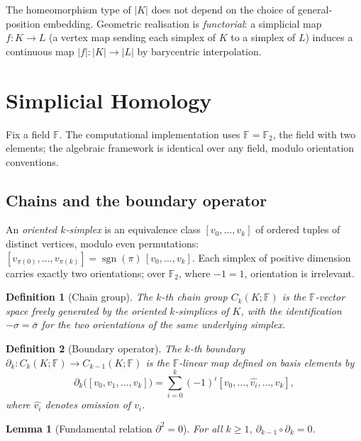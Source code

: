 \documentclass[onluarkali,ingilizce,yukseklisans,karton,LisansustuEgitim]{itutez}
\newtheorem{definition}{Definition}[chapter]
\newtheorem{lemma}{Lemma}[chapter]
\DeclareMathOperator{\sgn}{sgn}
\providecommand{\F}{\mathbb{F}}
\providecommand{\1}{\mathbf{1}}
\begin{document}
The homeomorphism type of $|K|$ does not depend on the choice of general-position embedding. Geometric realisation is \emph{functorial}: a simplicial map $f\colon K\to L$ (a vertex map sending each simplex of $K$ to a simplex of $L$) induces a continuous map $|f|\colon|K|\to|L|$ by barycentric interpolation.

\section{Simplicial Homology}
\label{subsec:homology}

Fix a field $\F$. The computational implementation uses $\F=\F_2$, the field with two elements; the algebraic framework is identical over any field, modulo orientation conventions.

\subsection{Chains and the boundary operator}

An \emph{oriented $k$-simplex} is an equivalence class $[v_0,\ldots,v_k]$ of ordered tuples of distinct vertices, modulo even permutations: $[v_{\pi(0)},\ldots,v_{\pi(k)}]=\sgn(\pi)\,[v_0,\ldots,v_k]$. Each simplex of positive dimension carries exactly two orientations; over $\F_2$, where $-1=1$, orientation is irrelevant.

\begin{definition}[Chain group]
\label{def:chains}
The \emph{$k$-th chain group} $C_k(K;\F)$ is the $\F$-vector space freely generated by the oriented $k$-simplices of $K$, with the identification $-\sigma=\bar\sigma$ for the two orientations of the same underlying simplex.
\end{definition}

\begin{definition}[Boundary operator]
\label{def:boundary}
The \emph{$k$-th boundary} $\partial_k\colon C_k(K;\F)\to C_{k-1}(K;\F)$ is the $\F$-linear map defined on basis elements by
\begin{equation}
  \partial_k\bigl([v_0,v_1,\ldots,v_k]\bigr)
  =\sum_{i=0}^k(-1)^i[v_0,\ldots,\widehat{v_i},\ldots,v_k],
  \label{eq:boundary}
\end{equation}
where $\widehat{v_i}$ denotes omission of $v_i$.
\end{definition}

\begin{lemma}[Fundamental relation $\partial^2=0$]
\label{lem:boundary-squared}
For all $k\geq 1$, $\partial_{k-1}\circ\partial_k=0$.
\end{lemma}
\end{document}
